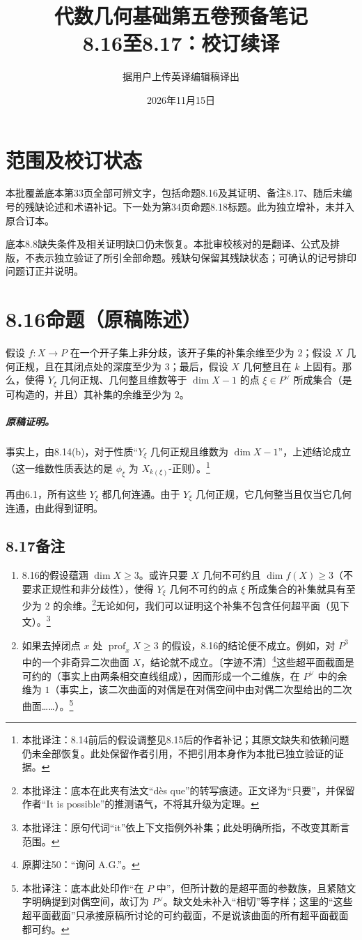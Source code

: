 \documentclass[openany]{ctexbook}
\title{代数几何基础第五卷预备笔记\\8.16至8.17：校订续译}
\author{据用户上传英译编辑稿译出}
\date{2026年11月15日}
\newcommand{\note}[1]{\footnote{本批译注：#1}}
\begin{document}
\maketitle
\chapter*{范围及校订状态}
本批覆盖底本第33页全部可辨文字，包括命题8.16及其证明、备注8.17、随后未编号的残缺论述和术语补记。下一处为第34页命题8.18标题。此为独立增补，未并入原合订本。

底本8.8缺失条件及相关证明缺口仍未恢复。本批审校核对的是翻译、公式及排版，不表示独立验证了所引全部命题。残缺句保留其残缺状态；可确认的记号排印问题订正并说明。
\chapter*{8.16\quad 命题（原稿陈述）}
假设 $f\colon X\to P$ 在一个开子集上非分歧，该开子集的补集余维至少为 $2$；假设 $X$ 几何正规，且在其闭点处的深度至少为 $3$；最后，假设 $X$ 几何整且在 $k$ 上固有。那么，使得 $Y_\xi$ 几何正规、几何整且维数等于 $\dim X-1$ 的点 $\xi\in P^\vee$ 所成集合（是可构造的，并且）其补集的余维至少为 $2$。

\paragraph{原稿证明。}
事实上，由8.14(b)，对于性质“$Y_\xi$ 几何正规且维数为 $\dim X-1$”，上述结论成立（这一维数性质表达的是 $\phi_\xi$ 为 $X_{k(\xi)}$-正则）。\note{8.14前后的假设调整见8.15后的作者补记；其原文缺失和依赖问题仍未全部恢复。此处保留作者引用，不把引用本身作为本批已独立验证的证据。}

再由6.1，所有这些 $Y_\xi$ 都几何连通。由于 $Y_\xi$ 几何正规，它几何整当且仅当它几何连通，由此得到证明。
\section*{8.17\quad 备注}
\begin{enumerate}
\item[(a)] 8.16的假设蕴涵 $\dim X\ge3$。或许只要 $X$ 几何不可约且 $\dim f(X)\ge3$（不要求正规性和非分歧性），使得 $Y_\xi$ 几何不可约的点 $\xi$ 所成集合的补集就具有至少为 $2$ 的余维。\note{底本在此夹有法文“dès que”的转写痕迹。正文译为“只要”，并保留作者“It is possible”的推测语气，不将其升级为定理。}无论如何，我们可以证明这个补集不包含任何超平面（见下文）。\note{原句代词“it”依上下文指例外补集；此处明确所指，不改变其断言范围。}
\item[(b)] 如果去掉闭点 $x$ 处 $\operatorname{prof}_xX\ge3$ 的假设，8.16的结论便不成立。例如，对 $P^3$ 中的一个非奇异二次曲面 $X$，结论就不成立。〔字迹不清〕\footnote{原脚注50：“询问 A.G.”。}这些超平面截面是可约的（事实上由两条相交直线组成），因而形成一个二维族，在 $P^\vee$ 中的余维为 $1$（事实上，该二次曲面的对偶是在对偶空间中由对偶二次型给出的二次曲面……）。\note{底本此处印作“在 $P$ 中”，但所计数的是超平面的参数族，且紧随文字明确提到对偶空间，故订为 $P^\vee$。缺文处未补入“相切”等字样；这里的“这些超平面截面”只承接原稿所讨论的可约截面，不是说该曲面的所有超平面截面都可约。}
\end{enumerate}
\end{document}
